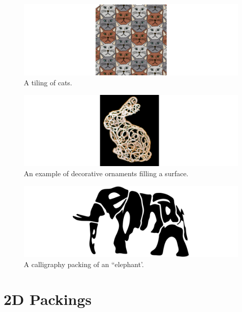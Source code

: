 \begin{figure}
\centering
\includegraphics[width=1.0\textwidth]{figures/related/escherization.pdf} 
\caption[An example of a tiling]
{\label{fig_related_escherization} 
A tiling of cats. }
\end{figure}

\begin{figure}
\centering
\includegraphics[width=1.0\textwidth]{figures/related/zehnder.pdf} 
\caption[An example of decorative ornaments filling a surface]
{\label{fig_related_zehnder} 
An example of decorative ornaments filling a surface.}
\end{figure}

\begin{figure}
\centering
\includegraphics[width=1.0\textwidth]{figures/related/calligraphy.pdf} 
\caption[A calligraphy packing of an ``elephant'']
{\label{fig_calligraphy} 
A calligraphy packing of an ``elephant'.}
\end{figure}


\section{2D Packings}

